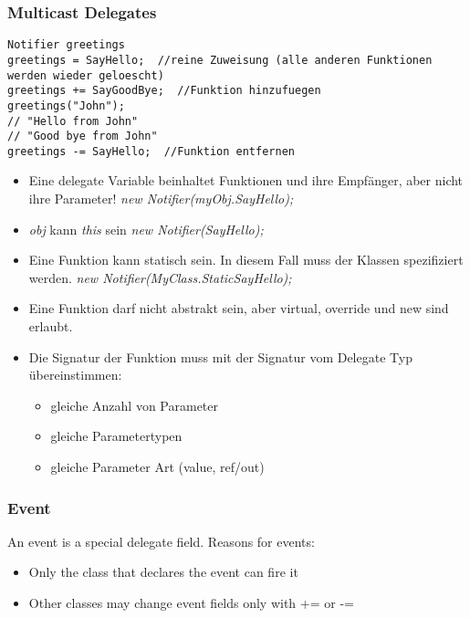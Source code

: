 \subsubsection{Multicast Delegates}
\begin{lstlisting}
Notifier greetings
greetings = SayHello;  //reine Zuweisung (alle anderen Funktionen werden wieder geloescht)
greetings += SayGoodBye;  //Funktion hinzufuegen
greetings("John");
// "Hello from John"
// "Good bye from John"
greetings -= SayHello;  //Funktion entfernen
\end{lstlisting}

\begin{itemize}
  \item  Eine delegate Variable beinhaltet Funktionen und ihre Empfänger, aber nicht ihre Parameter!\newline
         \textit{new Notifier(myObj.SayHello);}
  \item  \textit{obj} kann \textit{this} sein \newline
         \textit{new Notifier(SayHello);}
  \item  Eine Funktion kann statisch sein. In diesem Fall muss der Klassen spezifiziert werden. \newline
         \textit{new Notifier(MyClass.StaticSayHello);}
  \item  Eine Funktion darf nicht abstrakt sein, aber virtual, override und new sind erlaubt.
  \item  Die Signatur der Funktion muss mit der Signatur vom Delegate Typ übereinstimmen:
			   \begin{itemize}
			     \item gleiche Anzahl von Parameter
			     \item gleiche Parametertypen
			     \item gleiche Parameter Art (value, ref/out)
			   \end{itemize}
\end{itemize}

\subsubsection{Event}
An event is a special delegate field. Reasons for events:
\begin{itemize}
  \item Only the class that declares the event can fire it
  \item Other classes may change event fields only with += or -=
\end{itemize}

